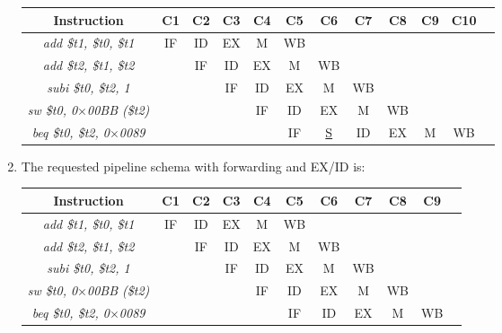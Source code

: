 \begin{enumerate}
\begin{table}[H]
\begin{tabular}{c|ccccccccccc}
            \textbf{Instruction}          & \textbf{C1} & \textbf{C2} & \textbf{C3} & \textbf{C4} & \textbf{C5} & \textbf{C6} & \textbf{C7} & \textbf{C8} & \textbf{C9} & \textbf{C10} \\ \hline
            \textit{add \$t1, \$t0, \$t1}   & IF          & ID          & EX          & M           & WB          &             &             &             &             &              \\ 
            \textit{add \$t2, \$t1, \$t2}   &             & IF          & ID          & EX          & M           & WB          &             &             &             &              \\ 
            \textit{subi \$t0, \$t2, 1}     &             &             & IF          & ID          & EX          & M           & WB          &             &             &              \\ 
            \textit{sw \$t0, 0$\times$00BB (\$t2)}  &             &             &             & IF          & ID          & EX          & M           & WB          &             &              \\ 
            \textit{beq \$t0, \$t2, 0$\times$0089} &             &             &             &             & IF          & \underline{S}      & ID          & EX          & M           & WB           \\ 
            \end{tabular}
        \end{table}
    \item The requested pipeline schema with forwarding and EX/ID is:
        \begin{table}[H]
            \centering
            \begin{tabular}{c|cccccccccc}
            \textbf{Instruction}          & \textbf{C1} & \textbf{C2} & \textbf{C3} & \textbf{C4} & \textbf{C5} & \textbf{C6} & \textbf{C7} & \textbf{C8} & \textbf{C9} \\ \hline
            \textit{add \$t1, \$t0, \$t1}   & IF          & ID          & EX          & M           & WB          &             &             &             &             \\ 
            \textit{add \$t2, \$t1, \$t2}   &             & IF          & ID          & EX          & M           & WB          &             &             &             \\ 
            \textit{subi \$t0, \$t2, 1}     &             &             & IF          & ID          & EX          & M           & WB          &             &             \\ 
            \textit{sw \$t0, 0$\times$00BB (\$t2)}  &             &             &             & IF          & ID          & EX          & M           & WB          &             \\ 
            \textit{beq \$t0, \$t2, 0$\times$0089} &             &             &             &             & IF          & ID          & EX          & M           & WB          \\ 
            \end{tabular}
        \end{table}
\end{enumerate}